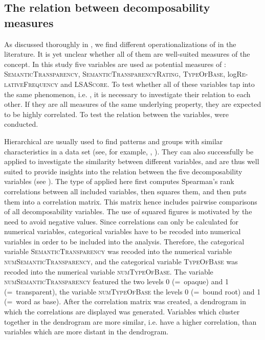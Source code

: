 \subsection{The relation between decomposability measures} \label{The Relation between Decomposability Measures} 
 


As discussed thoroughly in , we find different operationalizations of  in the literature. It is yet unclear whether all of them are well-suited measures of the concept. In this study five variables are used as potential measures of : \textsc{SemanticTransparency}, \textsc{SemanticTransparencyRating}, \textsc{TypeOfBase}, log\textsc{Re-lativeFrequency} and \textsc{LSAScore}.
To test whether all of these variables tap into the same phenomenon, i.e. , it is necessary to investigate their relation to each other. If they are all measures of the same underlying property, they are expected to be highly correlated. To test the relation between the variables,  were conducted. 

Hierarchical  are usually used to find patterns and groups with similar characteristics in a data  set (see, for example, \citealt[chapter 5.1.5]{Baayen.2008}, \citealt[chapter 8.1]{Zumel.2014}). They can also successfully be applied to investigate the similarity between different variables, and are thus well suited to provide insights into the relation between the five decomposability variables (see \citealt[200 f.]{Baayen.2008}). 
The type of  applied here first computes Spearman's rank correlations between all included variables, then squares them, and then puts them into a correlation matrix. This matrix hence includes pairwise comparisons of all decomposability variables. The use of squared figures is motivated by the need to avoid negative values.
Since correlations can only be calculated for numerical variables,  categorical variables have to be recoded into numerical variables in order to be included into the analysis. 
Therefore, the categorical variable \textsc{SemanticTransparency}  was recoded into the numerical variable \textsc{numSemanticTransparency}, and the categorical variable \textsc{TypeOfBase} was recoded into the numerical variable \textsc{numTypeOfBase}.  The variable \textsc{numSemanticTransparency} featured  the two levels 0 (=~opaque) and 1 (=~transparent), the variable \textsc{numTypeOfBase} the levels 0 (=~bound root) and 1 (=~word as base). After the correlation matrix was created,  a dendrogram in which the correlations are displayed was generated. Variables which cluster together in the dendrogram are more similar, i.e. have a higher correlation, than variables which are more distant in the dendrogram. 


